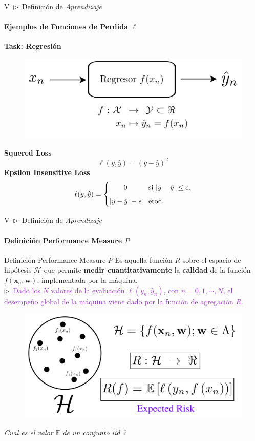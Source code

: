 \documentclass[xcolor=dvipsnames]{beamer}
\begin{document}
    \begin{frame}{V~$\rhd$~Definición de \textit{Aprendizaje}}
    \framesubtitle{Ejemplos de Funciones de Perdida $\ell$}
        \textbf{\Large{Task: Regresión}}
        \begin{figure}
            \centering
            \includegraphics[width=0.6\linewidth]{imgs/def01/task05.png}
        \end{figure}
        \textbf{\Large{Squered Loss}}
        \begin{equation*}
            \ell(y, \hat{y}) = (y-\hat{y})^{2}
        \end{equation*}
        \textbf{\Large{Epsilon Insensitive Loss}}
        \begin{equation*}
            \ell(y, \hat{y}) = 
            \begin{cases} 
            \hfill 0 \hfill & \text{si } |y - \hat{y}| \leq \epsilon, \\[5pt]  
            \hfill |y - \hat{y}| - \epsilon \hfill & \text{etoc}.
            \end{cases}
        \end{equation*}
    \end{frame}

    \begin{frame}{V~$\rhd$~Definición de \textit{Aprendizaje}}
    \framesubtitle{Definición Performance Measure \( P \)}
        \begin{block}{Definición Performance Measure \( P \)}
        Es aquella función $R$ sobre el espacio de hipótesis $\mathcal{H}$ que permite \textbf{medir cuantitativamente} la \textbf{calidad} de la función $f(\mathbf{x}_{n}, \mathbf{w})$, implementada por la máquina.\\
        \vspace{2mm}
        $\rhd$~\textcolor{DarkOrchid}{Dado los $N$ valores de la evaluación $\ell(y_{n},\hat{y}_{n})$, con $n=0,1,\cdots,N$, el desempeño global de la máquina viene dado por la función de agregación $R$.}
        \end{block}
        \begin{figure}
            \centering
            \includegraphics[width=0.5\linewidth]{imgs/def03/measure04.png}
        \end{figure}
        \textit{Cual es el valor $\mathbb{E}$ de un conjunto iid ?}%
    \end{frame}
\end{document}
